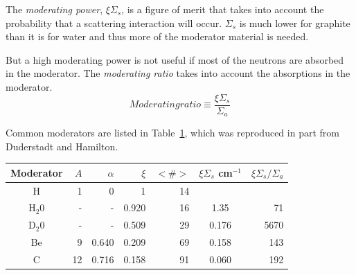 The \textit{moderating power}, $\xi \Sigma_s$, is a figure of merit that takes into account the probability that a scattering interaction will occur. $\Sigma_s$ is much lower for graphite than it is for water and thus more of the moderator material is needed.

But a high moderating power is not useful if most of the neutrons are absorbed in the moderator. The \textit{moderating ratio} takes into account the absorptions in the moderator.
\begin{equation}
  Moderating ratio \equiv \frac{\xi \Sigma_s}{\Sigma_a}
\end{equation}

Common moderators are listed in Table~\ref{tab:moderators}, which was reproduced in part from Duderstadt and Hamilton\cite{Duderstadt}.

\begin{table} \label{tab:moderators}
\begin{tabular}{crrrrcr}
\hline
Moderator & $A$ & $\alpha$ & $\xi$ & $<\#>$ &$\xi \Sigma_s$ cm$^{-1}$ &$\xi \Sigma_s/\Sigma_a$\\
\hline
H & 1 & 0 & 1 & 14 \\
H$_2$0 & - & - & 0.920 & 16 & 1.35 & 71 \\
D$_2$0 & - & - & 0.509 & 29 & 0.176 & 5670 \\
Be & 9 & 0.640 & 0.209 & 69 & 0.158 & 143 \\
C & 12 & 0.716 & 0.158 & 91 & 0.060 & 192 \\
\hline
\end{tabular}
\end{table}


